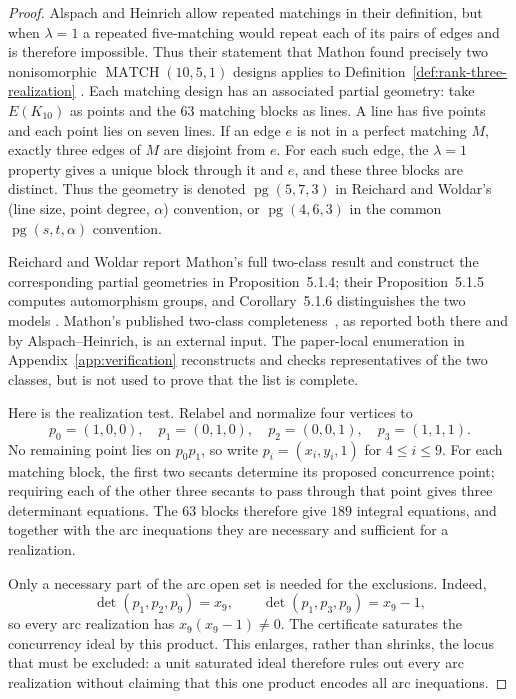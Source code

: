 \documentclass[11pt]{article}
\theoremstyle{definition}
\theoremstyle{remark}
\begin{document}
\begin{proof}
Alspach and Heinrich allow repeated matchings in their definition, but
when \(\lambda=1\) a repeated five-matching would repeat each of its pairs
of edges and is therefore impossible.  Thus their statement that Mathon
found precisely two nonisomorphic
\(\operatorname{MATCH}(10,5,1)\) designs applies to
Definition~\ref{def:rank-three-realization}
\cite[p.~40, opening classification paragraph]{AlspachHeinrich1990}.
Each matching design has an associated partial geometry: take
\(E(K_{10})\) as points and the \(63\) matching blocks as lines.  A line
has five points and each point lies on seven lines.  If an edge \(e\) is
not in a perfect matching \(M\), exactly three edges of \(M\) are disjoint
from \(e\).  For each such edge, the \(\lambda=1\) property gives a unique
block through it and \(e\), and these three blocks are distinct.  Thus the
geometry is denoted \(\operatorname{pg}(5,7,3)\) in Reichard and Woldar's
(line size, point degree, \(\alpha\)) convention, or
\(\operatorname{pg}(4,6,3)\) in the common
\(\operatorname{pg}(s,t,\alpha)\) convention.

Reichard and Woldar report Mathon's full two-class result and construct
the corresponding partial geometries in Proposition~5.1.4; their
Proposition~5.1.5 computes automorphism groups, and Corollary~5.1.6
distinguishes the two models
\cite[Proposition~5.1.4, Proposition~5.1.5, and
Corollary~5.1.6]{ReichardWoldar2022}.  Mathon's published two-class
completeness~\cite{Mathon1981}, as reported both there and by
Alspach--Heinrich, is an external input.  The paper-local enumeration in
Appendix~\ref{app:verification} reconstructs and checks representatives of
the two classes, but is not used to prove that the list is complete.

Here is the realization test.  Relabel and normalize four vertices to
\[
 p_0=(1,0,0),\quad p_1=(0,1,0),\quad
 p_2=(0,0,1),\quad p_3=(1,1,1).
\]
No remaining point lies on \(p_0p_1\), so write
\(p_i=(x_i,y_i,1)\) for \(4\le i\le9\).  For each matching block, the
first two secants determine its proposed concurrence point; requiring each
of the other three secants to pass through that point gives three
determinant equations.  The \(63\) blocks therefore give \(189\) integral
equations, and together with the arc inequations they are necessary and
sufficient for a realization.

Only a necessary part of the arc open set is needed for the exclusions.
Indeed,
\[
 \det(p_1,p_2,p_9)=x_9,\qquad
 \det(p_1,p_3,p_9)=x_9-1,
\]
so every arc realization has \(x_9(x_9-1)\ne0\).  The certificate
saturates the concurrency ideal by this product.  This enlarges, rather
than shrinks, the locus that must be excluded: a unit saturated ideal
therefore rules out every arc realization without claiming that this one
product encodes all arc inequations.


\end{proof}
\end{document}
